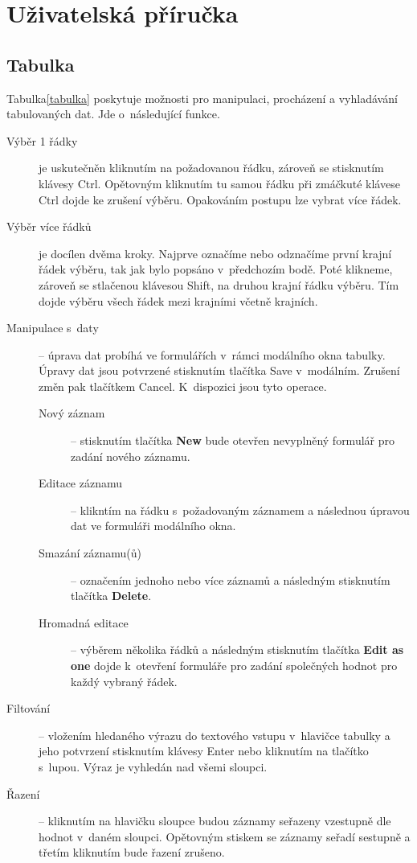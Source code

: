 \documentclass[thesis=B,czech]{FITthesis}[2012/06/26]
\begin{document}
\section{Uživatelská příručka}

\subsection{Tabulka}
	Tabulka\ref{tabulka} poskytuje možnosti pro manipulaci, procházení a vyhladávání tabulovaných dat. Jde o~následující funkce.
	\begin{description}
		\item[Výběr 1 řádky] je uskutečněn kliknutím na požadovanou řádku, zároveň se stisknutím klávesy Ctrl. Opětovným kliknutím tu samou řádku při zmáčkuté klávese Ctrl dojde ke zrušení výběru. Opakováním postupu lze vybrat více řádek.
		\item[Výběr více řádků] je docílen dvěma kroky. Najprve označíme nebo odznačíme první krajní řádek výběru, tak jak bylo popsáno v~předchozím bodě. Poté klikneme, zároveň se stlačenou klávesou Shift, na druhou krajní řádku výběru. Tím dojde výběru všech řádek mezi krajními včetně krajních.
		\item[Manipulace s~daty] -- úprava dat probíhá ve formulářích v~rámci modálního okna tabulky. Úpravy dat jsou potvrzené stisknutím tlačítka Save v~modálním. Zrušení změn pak tlačítkem Cancel. K~dispozici jsou tyto operace.
			\begin{description}
				\item[Nový záznam] -- stisknutím tlačítka \textbf{New} bude otevřen nevyplněný formulář pro zadání nového záznamu.
				\item[Editace záznamu] -- klikntím na řádku s~požadovaným záznamem a následnou úpravou dat ve formuláři modálního okna.
				\item[Smazání záznamu(ů)] -- označením jednoho nebo více záznamů a následným stisknutím tlačítka \textbf{Delete}.
				\item[Hromadná editace] -- výběrem několika řádků a následným stisknutím tlačítka \textbf{Edit as one} dojde k~otevření formuláře pro zadání společných hodnot pro každý vybraný řádek.
			\end{description}
		\item[Filtování] -- vložením hledaného výrazu do textového vstupu v~hlavičce tabulky a jeho potvrzení stisknutím klávesy Enter nebo kliknutím na tlačítko s~lupou. Výraz je vyhledán nad všemi sloupci.
		\item[Řazení] -- kliknutím na hlavičku sloupce budou záznamy seřazeny vzestupně dle hodnot v~daném sloupci. Opětovným stiskem se záznamy seřadí sestupně a třetím kliknutím bude řazení zrušeno.

\end{description}
\end{document}
